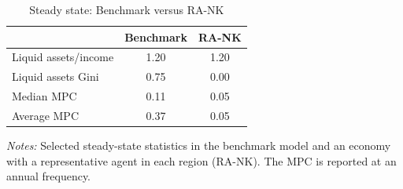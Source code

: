 \documentclass[\latexroot/\projectname]{subfiles}
\begin{document}
\begin{table}[h]
  \centering
  \caption{Steady state: Benchmark versus RA-NK\whenintegrated{\label{tab:robust-steady-state-rank}}}
  \begin{tabular}{lcc}
    \hline
     & \textbf{Benchmark} & \textbf{RA-NK} \\
    \hline
    Liquid assets/income & 1.20 & 1.20 \\
    Liquid assets Gini & 0.75 & 0.00 \\
    Median MPC & 0.11 & 0.05 \\
    Average MPC & 0.37 & 0.05 \\
    \hline
  \end{tabular}
  \begin{flushleft}
    \footnotesize
    \textit{Notes:} Selected steady-state statistics in the benchmark model and an economy with a representative agent in each region (RA-NK). The MPC is reported at an annual frequency.
  \end{flushleft}
\end{table}

\smartbib
\end{document}
